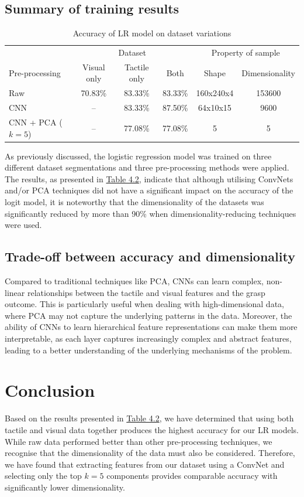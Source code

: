 \documentclass[11pt, a4paper]{report}
\begin{document}
\subsection{Summary of training results}\label{sec:4.5.1}
\label{sec:4.5.1}
\begin{table}[H]
    \centering
    \small
    \begin{tabular}{lccccc}
        \toprule
        & \multicolumn{3}{c}{Dataset} & \multicolumn{2}{c}{Property of sample} \\
        \cmidrule{2-4}\cmidrule{5-6}
        Pre-processing & Visual only & Tactile only & Both & Shape & Dimensionality \\
        \midrule
        Raw & 70.83\% & 83.33\% & 83.33\% & 160x240x4 & 153600 \\
        CNN & -- & 83.33\% & 87.50\% & 64x10x15  & 9600 \\
        CNN + PCA ($k=5$) & -- & 77.08\% & 77.08\% & 5 & 5\\
        \bottomrule
    \end{tabular}
    \caption{Accuracy of LR model on dataset variations}
    \label{tbl:4.2}
\end{table}
As previously discussed, the logistic regression model was trained on three different dataset segmentations and three pre-processing methods were applied. The results, as presented in \hyperref[tbl:4.2]{Table 4.2}, indicate that although utilising ConvNets and/or PCA techniques did not have a significant impact on the accuracy of the logit model, it is noteworthy that the dimensionality of the datasets was significantly reduced by more than 90\% when dimensionality-reducing techniques were used.


\subsection{Trade-off between accuracy and dimensionality}\label{sec:4.5.2}
Compared to traditional techniques like PCA, CNNs can learn complex, non-linear relationships between the tactile and visual features and the grasp outcome. This is particularly useful when dealing with high-dimensional data, where PCA may not capture the underlying patterns in the data. Moreover, the ability of CNNs to learn hierarchical feature representations can make them more interpretable, as each layer captures increasingly complex and abstract features, leading to a better understanding of the underlying mechanisms of the problem.


\section{Conclusion}\label{sec:4.6}
Based on the results presented in \hyperref[tbl:4.2]{Table 4.2}, we have determined that using both tactile and visual data together produces the highest accuracy for our LR models. While raw data performed better than other pre-processing techniques, we recognise that the dimensionality of the data must also be considered. Therefore, we have found that extracting features from our dataset using a ConvNet and selecting only the top $k=5$ components provides comparable accuracy with significantly lower dimensionality.
\end{document}
